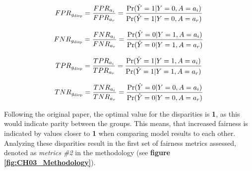 \begin{equation}
    FPR_{g_{\text{disp}}} = \frac{FPR_{a_i}}{FPR_{a_r}} = \frac{\Pr(\hat{Y}=1 | Y=0, A=a_i)}{\Pr(\hat{Y}=1 | Y=0, A=a_r)}
    \label{eq:FPR_Disparity}
    \addcontentsline{frm}{formulas}{\protect\numberline{\theequation}\hspace{1em}FPR Disparity}
\end{equation}

\begin{equation}
    FNR_{g_{\text{disp}}} = \frac{FNR_{a_i}}{FNR_{a_r}} = \frac{\Pr(\hat{Y}=0 | Y=1, A=a_i)}{\Pr(\hat{Y}=0 | Y=1, A=a_r)}
    \label{eq:FNR_Disparity}
    \addcontentsline{frm}{formulas}{\protect\numberline{\theequation}\hspace{1em}FNR Disparity}
\end{equation}

\begin{equation}
    TPR_{g_{\text{disp}}} = \frac{TPR_{a_i}}{TPR_{a_r}} = \frac{\Pr(\hat{Y}=1 | Y=1, A=a_i)}{\Pr(\hat{Y}=1 | Y=1, A=a_r)}
    \label{eq:TPR_Disparity}
    \addcontentsline{frm}{formulas}{\protect\numberline{\theequation}\hspace{1em}TPR Disparity}
\end{equation}

\begin{equation}
    TNR_{g_{\text{disp}}} = \frac{TNR_{a_i}}{TNR_{a_r}} = \frac{\Pr(\hat{Y}=0 | Y=0, A=a_i)}{\Pr(\hat{Y}=0 | Y=0, A=a_r)}
    \label{eq:TNR_Disparity}
    \addcontentsline{frm}{formulas}{\protect\numberline{\theequation}\hspace{1em}TNR Disparity}
\end{equation}

Following the original paper, the optimal value for the disparities is \textbf{1}, as this would indicate parity between the groups. This means, that increased fairness is indicated by values closer to \textbf{1} when comparing model results to each other.
Analyzing these disparities result in the first set of fairness metrics assessed, denoted as \textit{metrics \#2} in the methodology (see \textbf{figure \ref{fig:CH03_Methodology}}).


